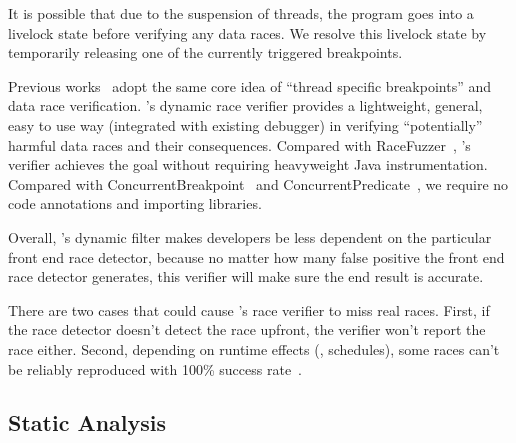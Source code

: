 It is possible that due to the suspension of threads, the program goes into a 
livelock state before verifying any data races. We resolve this livelock state
by temporarily releasing one of the currently triggered breakpoints. 



Previous works~\cite{racefuzzer, conbreak, conpredicates} adopt the same core
idea of “thread specific breakpoints” and
data race verification. \xxx's dynamic race verifier provides a lightweight,
general, easy to use way (integrated with existing debugger)
in verifying “potentially” harmful data races and their consequences.
Compared with RaceFuzzer~\cite{racefuzzer}, \xxx's verifier achieves the goal 
without requiring heavyweight Java instrumentation. Compared with
ConcurrentBreakpoint~\cite{conbreak} and ConcurrentPredicate~\cite{conpredicates},
we require no code annotations and importing libraries.

Overall, \xxx's dynamic filter makes developers be less dependent on 
the particular front end race detector, because no matter how many false 
positive the front end race detector generates, this verifier will make sure 
the end result is accurate.

There are two cases that could cause \xxx's race verifier to miss real races. First, if the 
race detector doesn't detect the race upfront, the verifier won't report the 
race either. Second, depending on runtime effects (\eg, schedules), some races 
can't be reliably reproduced with 100\% success rate~\cite{conpredicates}.


\subsection{Static Analysis}

